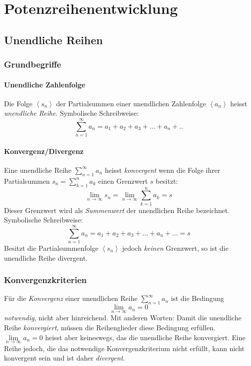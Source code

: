\chapter{Potenzreihenentwicklung}
\section{Unendliche Reihen}
\subsection{Grundbegriffe}
\subsubsection*{Unendliche Zahlenfolge}
\begin{definition}
Die Folge $\left<s_n\right>$ der Partialsummen einer unendlichen Zahlenfolge $\left<a_n\right>$ heisst \textit{unendliche Reihe}. Symbolische Schreibweise: 
$$ \sum\limits_{n=1}^{\infty} a_n = a_1 + a_2 + a_3 + ... + a_n + ..$$
\end{definition}

\subsubsection*{Konvergenz/Divergenz}
\begin{definition}Eine unendliche Reihe $\sum\limits_{n=1}^{\infty} a_n$ heisst \textit{konvergent} wenn die Folge ihrer Partialsummen $ s_n = \sum\limits_{k=1}^{n} a_k $ einen Grenzwert $s$ besitzt:
\[ \lim_{n \rightarrow \infty} s_n = \lim_{n \rightarrow \infty} \sum_{k=1}^{n} a_k = s \]
Dieser Grenzwert wird als \textit{Summenwert} der unendlichen Reihe bezeichnet. Symbolische Schreibweise:
$$\sum\limits_{n=1}^{\infty} a_n = a_1 + a_2 + a_3 + ...+ a_n +...=s$$
Besitzt die Partialsummenfolge $\left< s_n \right>$ jedoch \textit{keinen} Grenzwert, so ist die unendliche Reihe divergent.
\end{definition}

\subsection{Konvergenzkriterien}
\begin{definition}Für die \textit{Konvergenz} einer unendlichen Reihe $\sum\limits_{n=1}^{\infty} a_n$ ist die Bedingung 
$$ \lim\limits_{n \rightarrow \infty} a_n = 0$$
\textit{notwendig}, nicht aber hinreichend. Mit anderen Worten: Damit die unendliche Reihe \textit{konvergiert}, müssen die Reihenglieder diese Bedingung erfüllen. $\lim\limits_{n \rightarrow \infty} a_n = 0$ heisst aber keineswegs, das die unendliche Reihe konvergiert. Eine Reihe jedoch, die das notwendige Konvergenzkriterium nicht erfüllt, kann nicht konvergent sein und ist daher \textit{divergent}.
\end{definition}

